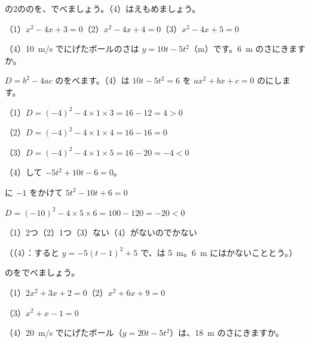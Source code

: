 \begin{reidai}[\R{判別式}{はん|べつ|しき}で、\R{解}{かい}の\R{個数}{こ|すう}を\R{調}{しら}べる]
の2ののを、でべましょう。（4）はえもめましょう。\par
（1）\nobreak $x^2-4x+3=0$\quad（2）\nobreak $x^2-4x+4=0$\quad（3）\nobreak $x^2-4x+5=0$\par
（4）\nobreak \qty{10}{m/s} でにげたボールのさは $y=10t-5t^2$（m）です。\qty{6}{m} のさにきますか。\par
\kangaekata $D=b^2-4ac$ のをべます。（4）は $10t-5t^2=6$ を $ax^2+bx+c=0$ のにします。\par
\shiki（1）\nobreak $D=(-4)^2-4\times1\times3=16-12=4>0$\par
\hspace*{2.6\zw}（2）\nobreak $D=(-4)^2-4\times1\times4=16-16=0$\par
\hspace*{2.6\zw}（3）\nobreak $D=(-4)^2-4\times1\times5=16-20=-4<0$\par
\hspace*{2.6\zw}（4）\nobreak {}して $-5t^2+10t-6=0$。\par
\hspace*{4.3\zw}に $-1$ をかけて $5t^2-10t+6=0$\par
\hspace*{4.3\zw}$D=(-10)^2-4\times5\times6=100-120=-20<0$\par
\kotae（1）\nobreak 2つ\quad（2）\nobreak 1つ\quad（3）\nobreak ない\quad（4）\nobreak {}がないのでかない\par
（（4）：すると $y=-5(t-1)^2+5$ で、は \qty{5}{m}。\qty{6}{m} にはかないこととう。）
\end{reidai}



\begin{jibun}
のをでべましょう。\par
（1）\nobreak $2x^2+3x+2=0$\quad（2）\nobreak $x^2+6x+9=0$\par
（3）\nobreak $x^2+x-1=0$\par
（4）\nobreak \qty{20}{m/s} でにげたボール（$y=20t-5t^2$）は、\qty{18}{m} のさにきますか。
\end{jibun}

